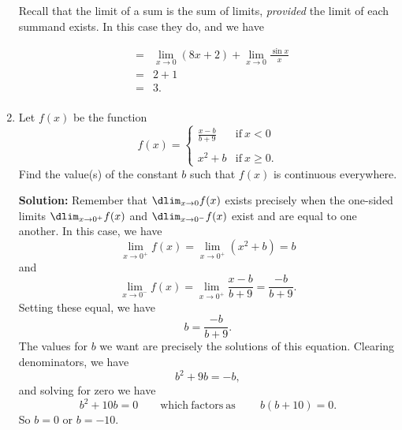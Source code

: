 \documentclass{article}
\begin{document}
\begin{enumerate}
Recall that the limit of a sum is the sum of limits, \emph{provided} the limit of each summand exists. In this case they do, and we have

\begin{eqnarray*}
 & = & \lim_{x \rightarrow 0} \left( 8 x + 2 \right) + \lim_{x \rightarrow 0} \frac{\sin x}{x} \\
 & = & 2 + 1 \\
 & = & 3. \\
\end{eqnarray*}


  
\vspace{1cm}

\item Let $f(x)$ be the function \[ f(x) = \left\{ \begin{array}{ll} \frac{x-b}{b + 9} & \mathrm{if}\ x < 0 \\ & \\ x^2 + b & \mathrm{if}\ x \geq 0. \end{array}\right. \] Find the value(s) of the constant $b$ such that $f(x)$ is continuous everywhere.

\textbf{Solution:} Remember that $\dlim_{x \rightarrow 0} f(x)$ exists precisely when the one-sided limits $\dlim_{x \rightarrow 0^+} f(x)$ and $\dlim_{x \rightarrow 0^-} f(x)$ exist and are equal to one another. In this case, we have \[ \lim_{x \rightarrow 0^+} f(x) = \lim_{x \rightarrow 0^+} (x^2 + b) = b \] and \[ \lim_{x \rightarrow 0^-} f(x) = \lim_{x \rightarrow 0^+} \frac{x-b}{b + 9} = \frac{-b}{b + 9}. \]
Setting these equal, we have \[ b = \frac{-b}{b + 9}. \]
The values for $b$ we want are precisely the solutions of this equation.
Clearing denominators, we have \[ b^2 + 9 b = -b, \] and solving for zero we have \[ b^2 + 10b = 0 \quad\quad \mathrm{which\ factors\ as}\ \quad\quad b (b + 10) = 0. \]
So $b = 0$ or $b = -10$.

  
\vspace{1cm}
\end{enumerate}
\end{document}
